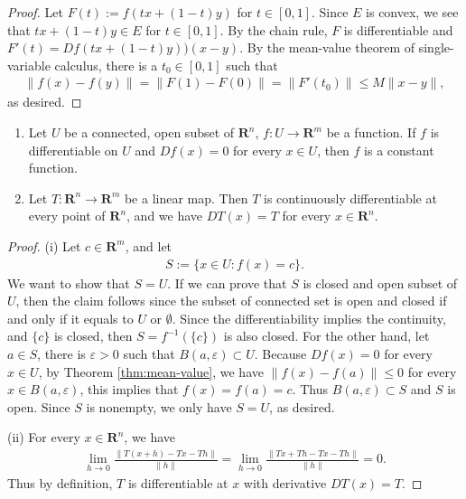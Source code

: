 \begin{proof}
    Let $F(t) := f(tx + (1 - t)y)$ for $t \in [0, 1]$. Since $E$ is convex, we see that $tx + (1 - t)y \in E$ for $t \in [0, 1]$. By the chain rule, $F$ is differentiable and $F'(t) = Df(tx + (1 - t)y))(x - y)$. By the mean-value theorem of single-variable calculus, there is a $t_0 \in [0, 1]$ such that
        \begin{align*}
            \|f(x) - f(y)\| = \|F(1) - F(0)\| = \|F'(t_0)\|
            \leq M\|x - y\|,
        \end{align*}
    as desired.
\end{proof}

\begin{proposition}\label{lem:corollaries of chain rule}
\quad
    \begin{enumerate}
        \item Let $U$ be a connected, open subset of $\mathbf{R}^n$, $f : U \to \mathbf{R}^m$ be a function. If $f$ is differentiable on $U$ and $Df(x) = 0$ for every $x \in U$, then $f$ is a constant function.
        \item Let $T : \mathbf{R}^n \to \mathbf{R}^m$ be a linear map. Then $T$ is continuously differentiable at every point of $\mathbf{R}^n$, and we have $DT(x) = T$ for every $x \in \mathbf{R}^n$.
    \end{enumerate}
\end{proposition}

\begin{proof}
    (i) Let $c \in \mathbf{R}^m$, and let
        \begin{align*}
            S := \{x \in U : f(x) = c\}.
        \end{align*}
    We want to show that $S = U$. If we can prove that $S$ is closed and open subset of $U$, then the claim follows since the subset of connected set is open and closed if and only if it equals to $U$ or $\emptyset$. Since the differentiability implies the continuity, and $\{c\}$ is closed, then $S = f^{-1}(\{c\})$ is also closed. For the other hand, let $a \in S$, there is $\varepsilon > 0$ such that $B(a, \varepsilon) \subset U$. Because $Df(x) = 0$ for every $x \in U$, by Theorem \ref{thm:mean-value}, we have $\|f(x) - f(a)\| \leq 0$ for every $x \in B(a, \varepsilon)$, this implies that $f(x) = f(a) = c$. Thus $B(a, \varepsilon) \subset S$ and $S$ is open. Since $S$ is nonempty, we only have $S = U$, as desired.

    (ii) For every $x \in \mathbf{R}^n$, we have
        \begin{align*}
            \lim_{h \to 0}\frac{\|T(x + h) - Tx - Th\|}{\|h\|}
            = \lim_{h \to 0}\frac{\|Tx + Th - Tx - Th\|}{\|h\|}
            = 0.
        \end{align*}
    Thus by definition, $T$ is differentiable at $x$ with derivative $DT(x) = T$.
\end{proof}

